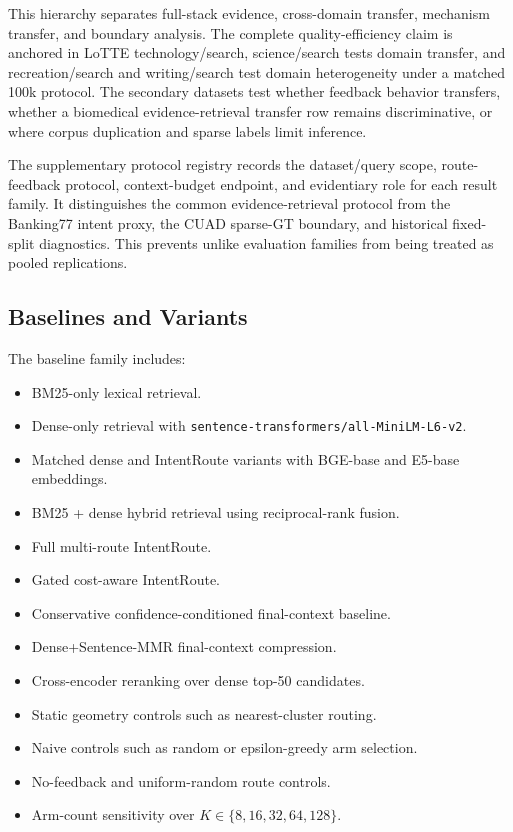 This hierarchy separates full-stack evidence, cross-domain transfer, mechanism transfer, and boundary analysis. The complete quality-efficiency claim is anchored in LoTTE technology/search, science/search tests domain transfer, and recreation/search and writing/search test domain heterogeneity under a matched 100k protocol. The secondary datasets test whether feedback behavior transfers, whether a biomedical evidence-retrieval transfer row remains discriminative, or where corpus duplication and sparse labels limit inference.

The supplementary protocol registry records the dataset/query scope, route-feedback protocol, context-budget endpoint, and evidentiary role for each result family. It distinguishes the common evidence-retrieval protocol from the Banking77 intent proxy, the CUAD sparse-GT boundary, and historical fixed-split diagnostics. This prevents unlike evaluation families from being treated as pooled replications.

\subsection{Baselines and Variants}
\label{sec:05-experimental-setup:baselines-and-variants}

The baseline family includes:

\begin{itemize}
\item BM25-only lexical retrieval.
\item Dense-only retrieval with \nolinkurl{sentence-transformers/all-MiniLM-L6-v2}.
\item Matched dense and IntentRoute variants with BGE-base and E5-base embeddings.
\item BM25 + dense hybrid retrieval using reciprocal-rank fusion.
\item Full multi-route IntentRoute.
\item Gated cost-aware IntentRoute.
\item Conservative confidence-conditioned final-context baseline.
\item Dense+Sentence-MMR final-context compression.
\item Cross-encoder reranking over dense top-50 candidates.
\item Static geometry controls such as nearest-cluster routing.
\item Naive controls such as random or epsilon-greedy arm selection.
\item No-feedback and uniform-random route controls.
\item Arm-count sensitivity over $K \in \{8,16,32,64,128\}$.
\end{itemize}

